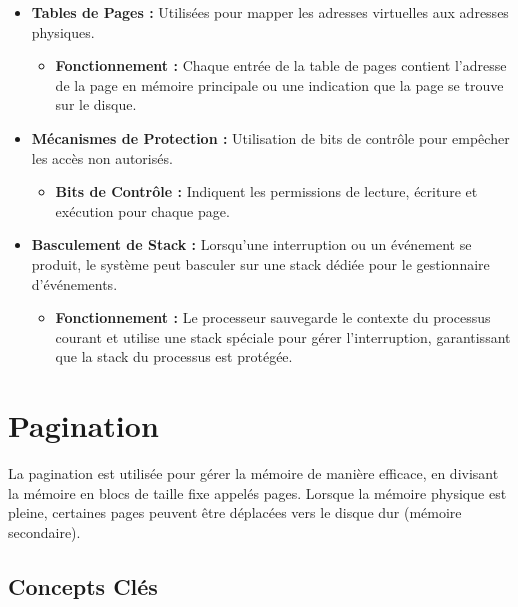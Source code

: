 \begin{itemize}
    \item \textbf{Tables de Pages :} Utilisées pour mapper les adresses virtuelles aux adresses physiques.
    \begin{itemize}
        \item \textbf{Fonctionnement :} Chaque entrée de la table de pages contient l'adresse de la page en mémoire principale ou une indication que la page se trouve sur le disque.
    \end{itemize}
    \item \textbf{Mécanismes de Protection :} Utilisation de bits de contrôle pour empêcher les accès non autorisés.
    \begin{itemize}
        \item \textbf{Bits de Contrôle :} Indiquent les permissions de lecture, écriture et exécution pour chaque page.
    \end{itemize}
    \item \textbf{Basculement de Stack :} Lorsqu'une interruption ou un événement se produit, le système peut basculer sur une stack dédiée pour le gestionnaire d'événements.
    \begin{itemize}
        \item \textbf{Fonctionnement :} Le processeur sauvegarde le contexte du processus courant et utilise une stack spéciale pour gérer l'interruption, garantissant que la stack du processus est protégée.
    \end{itemize}
\end{itemize}

\section*{Pagination}

La pagination est utilisée pour gérer la mémoire de manière efficace, en divisant la mémoire en blocs de taille fixe appelés pages. Lorsque la mémoire physique est pleine, certaines pages peuvent être déplacées vers le disque dur (mémoire secondaire).

\subsection*{Concepts Clés}


